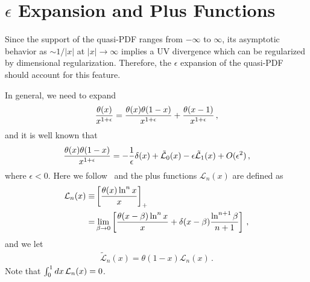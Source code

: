 \documentclass[prd,aps,twocolumn,preprintnumbers,showpacs,nofootinbib,superscriptaddress,notitlepage]{revtex4-1}
\newcommand{\beq}{\begin{eqnarray}}
\newcommand{\eeq}{\end{eqnarray}}
\newcommand{\nn}{\nonumber}
\begin{document}
\section{$\epsilon$ Expansion and Plus Functions}
\label{sec:ep}

Since the support of the quasi-PDF ranges from $-\infty$ to $\infty$, its asymptotic behavior as $\sim1/|x|$ at $|x|\to\infty$ implies a UV divergence which can be regularized by dimensional regularization. Therefore, the $\epsilon$ expansion of the quasi-PDF should account for this feature.

In general, we need to expand
\beq
	{\theta(x)\over x^{1+\epsilon}} = {\theta(x)\theta(1-x)\over x^{1+\epsilon}} + {\theta(x-1)\over x^{1+\epsilon}}\,,
\eeq
and it is well known that
\begin{align} \label{eq:ident}
{\theta(x)\theta(1-x)\over x^{1+\epsilon}} = - {1\over\epsilon}\delta(x)+
\tilde{\mathcal{L}}_0(x) - \epsilon \tilde{\mathcal{L}}_1(x)+ O(\epsilon^2)\,,
\end{align}
where $\epsilon<0$.
Here we follow~\cite{Ligeti:2008ac} and the plus functions $\mathcal{L}_n(x)$ are defined as
\begin{align} \label{eq:plus1}
	\mathcal{L}_n(x)\equiv &\left[ {\theta(x)\ln^nx\over x}\right]_+
   \\
	= &\lim_{\beta\to0} \left[{\theta(x-\beta)\ln^n x\over x} + \delta(x-\beta) {\ln^{n+1}\beta \over n+1}\right]
 \,, \nn
\end{align}
and we let
\begin{align}
  \tilde{\mathcal{L}}_n(x) = \theta(1-x) \mathcal{L}_n(x) \,.
\end{align}
Note that  $\int_0^1 dx \, {\cal L}_n(x) =0$.
\end{document}
